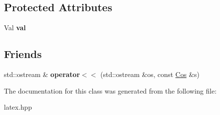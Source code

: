 \subsection*{Protected Attributes}
\begin{DoxyCompactItemize}
\item 
\hypertarget{classlatex_1_1math_1_1Cos_ad42d34196872805774e97b29e69a1896}{Val {\bfseries val}}\label{classlatex_1_1math_1_1Cos_ad42d34196872805774e97b29e69a1896}

\end{DoxyCompactItemize}
\subsection*{Friends}
\begin{DoxyCompactItemize}
\item 
\hypertarget{classlatex_1_1math_1_1Cos_ad5ef89e28352b35eb2cae598810a335d}{std\-::ostream \& {\bfseries operator$<$$<$} (std\-::ostream \&os, const \hyperlink{classlatex_1_1math_1_1Cos}{Cos} \&s)}\label{classlatex_1_1math_1_1Cos_ad5ef89e28352b35eb2cae598810a335d}

\end{DoxyCompactItemize}


The documentation for this class was generated from the following file\-:\begin{DoxyCompactItemize}
\item 
latex.\-hpp\end{DoxyCompactItemize}
